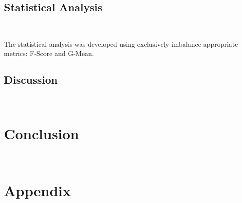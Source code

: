 \documentclass[parskip=full]{scrartcl}
\begin{document}
\subsection{Statistical Analysis}~\label{sec:statistical_analysis}

The statistical analysis was developed using exclusively imbalance-appropriate
metrics: F-Score and G-Mean. 





\subsection{Discussion}~\label{sec:discussion}

\section{Conclusion}~\label{sec:conclusion}




\appendix

\section{Appendix}


\end{document}
